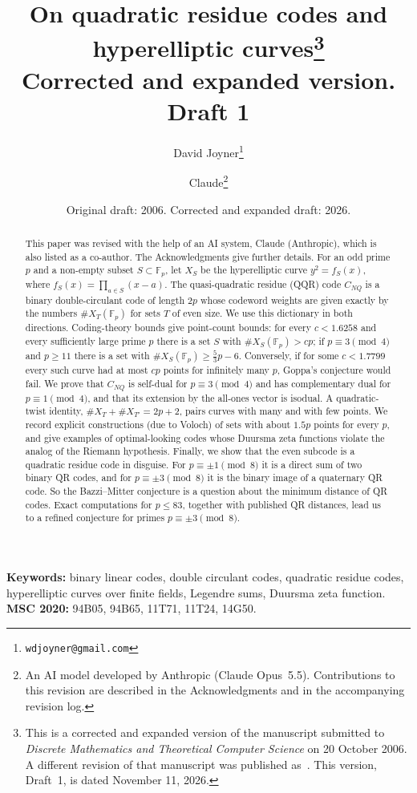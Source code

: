 \documentclass[12pt,letterpaper]{article}
\title{On quadratic residue codes and hyperelliptic curves\thanks{This is a
corrected and expanded version of the manuscript submitted to \emph{Discrete
Mathematics and Theoretical Computer Science} on 20 October 2006. A different
revision of that manuscript was published as~\cite{Jo08}. This version, Draft~1,
is dated November 11, 2026.}\\[4pt]
\large Corrected and expanded version. Draft 1}
\author{David Joyner\thanks{\texttt{wdjoyner@gmail.com}}
\and Claude\thanks{An AI model developed by Anthropic (Claude Opus~5.5). Contributions to this revision are described in the Acknowledgments and in the accompanying revision log.}}
\date{Original draft: 2006. Corrected and expanded draft: 2026.}
\theoremstyle{definition}
\theoremstyle{remark}
\numberwithin{equation}{section}
\newcommand{\Fp}{\mathbb{F}_p}
\newcommand{\CNQ}{C_{NQ}}
\newcommand{\X}{\#X}
\begin{document}
\maketitle

\begin{abstract}
This paper was revised with the help of an AI system, Claude (Anthropic), which is
also listed as a co-author. The Acknowledgments give further details.
For an odd prime $p$ and a non-empty subset $S\subset\Fp$, let $X_S$ be the
hyperelliptic curve $y^2=f_S(x)$, where $f_S(x)=\prod_{a\in S}(x-a)$.
The quasi-quadratic residue (QQR) code $\CNQ$ is a binary double-circulant code of
length $2p$ whose codeword weights are given exactly by the numbers $\X_T(\Fp)$ for
sets $T$ of even size. We use this dictionary in both directions.
Coding-theory bounds give point-count bounds: for every $c<1.6258$
and every sufficiently large prime $p$ there is a set $S$ with $\X_S(\Fp)>cp$;
if $p\equiv 3\pmod 4$ and $p\ge 11$ there is a set with $\X_S(\Fp)\ge \tfrac53 p-6$.
Conversely, if for some $c<1.7799$ every such curve had at most $cp$ points
for infinitely many $p$, Goppa's conjecture would fail.
We prove that $\CNQ$ is self-dual for $p\equiv3\pmod4$ and has complementary dual
for $p\equiv1\pmod 4$, and that its extension by the all-ones vector is isodual.
A quadratic-twist identity, $\X_T+\X_{T'}=2p+2$, pairs curves with many and with
few points. We record explicit constructions (due to Voloch) of sets with about
$1.5p$ points for every $p$, and give examples of optimal-looking codes whose
Duursma zeta functions violate the analog of the Riemann hypothesis.
Finally, we show that the even subcode is a quadratic residue code in disguise. For
$p\equiv\pm1\pmod8$ it is a direct sum of two binary QR codes, and for
$p\equiv\pm3\pmod8$ it is the binary image of a quaternary QR code. So the
Bazzi--Mitter conjecture is a question about the minimum distance of QR codes.
Exact computations for $p\le 83$, together with published QR distances, lead us to
a refined conjecture for primes $p\equiv\pm3\pmod 8$.
\end{abstract}

\noindent\textbf{Keywords:} binary linear codes, double circulant codes,
quadratic residue codes, hyperelliptic curves over finite fields, Legendre sums,
Duursma zeta function.\\
\textbf{MSC 2020:} 94B05, 94B65, 11T71, 11T24, 14G50.

\tableofcontents

\end{document}
